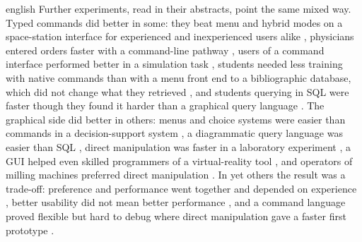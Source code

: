 \begin{onlyin}{english}
Further experiments, read in their abstracts, point the same mixed way.
Typed commands did better in some: they beat menu and hybrid modes on a
space-station interface for experienced and inexperienced users alike
\autocite{Antin1986Evaluation}, physicians entered orders faster with a
command-line pathway \autocite{Lovis2001Evaluation}, users of a command
interface performed better in a simulation task
\autocite{Schar1997Effect}, students needed less training with native
commands than with a menu front end to a bibliographic database, which
did not change what they retrieved \autocite{Sullivan1990End}, and
students querying in SQL were faster though they found it harder than a
graphical query language \autocite{Jones1996Articulating}.  The
graphical side did better in others: menus and choice systems were
easier than commands in a decision-support system
\autocite{Waring1992Factors}, a diagrammatic query language was easier
than SQL \autocite{Catarci1995Diagrammatic}, direct manipulation was
faster in a laboratory experiment \autocite{Lee2008Effects}, a GUI
helped even skilled programmers of a virtual-reality tool
\autocite{Fellmann2007Command}, and operators of milling machines
preferred direct manipulation \autocite{TorresChazaro1992Design}.  In
yet others the result was a trade-off: preference and performance went
together and depended on experience \autocite{Kissel1997Influence},
better usability did not mean better performance
\autocite{Chhanabhai2004First}, and a command language proved flexible
but hard to debug where direct manipulation gave a faster first
prototype \autocite{Kjeldskov2008Interaction}.


\end{onlyin}
